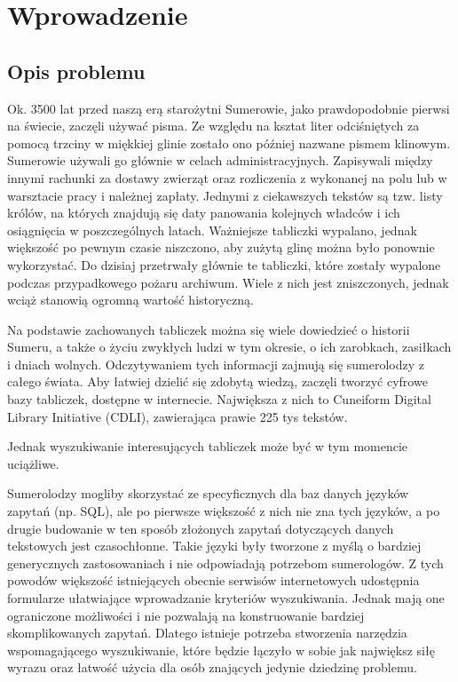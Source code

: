 \chapter*{Wprowadzenie}

 

\section*{Opis problemu}
Ok. 3500 lat przed naszą erą starożytni Sumerowie, jako prawdopodobnie pierwsi na świecie, zaczęli używać pisma. 
Ze względu na ksztat liter odciśniętych za pomocą trzciny w miękkiej glinie zostało ono później nazwane pismem klinowym. 
Sumerowie używali go głównie w celach administracyjnych. Zapisywali między innymi rachunki za dostawy zwierząt oraz rozliczenia z 
wykonanej na polu lub w warsztacie pracy i należnej zapłaty. Jednymi z ciekawszych tekstów są tzw. listy królów, na 
których znajdują się daty panowania kolejnych władców i ich osiągnięcia w poszczególnych latach. 
Ważniejsze tabliczki wypalano, jednak większość po pewnym czasie niszczono, aby zużytą glinę można było ponownie wykorzystać. 
Do dzisiaj przetrwały głównie te tabliczki, które zostały wypalone podczas przypadkowego pożaru archiwum. 
Wiele z nich jest zniszczonych, jednak wciąż stanowią ogromną wartość historyczną. 
 
Na podstawie zachowanych tabliczek można się wiele dowiedzieć o historii Sumeru, a także o życiu zwykłych ludzi w tym okresie, 
o ich zarobkach, zasiłkach i dniach wolnych. Odczytywaniem tych informacji zajmują się sumerolodzy z całego świata. 
Aby łatwiej dzielić się zdobytą wiedzą, zaczęli tworzyć cyfrowe bazy tabliczek, dostępne w internecie. 
Największa z nich to Cuneiform Digital Library Initiative (CDLI), zawierająca prawie 225 tys tekstów.

Jednak wyszukiwanie interesujących tabliczek może być w tym momencie uciążliwe. 

Sumerolodzy mogliby skorzystać ze specyficznych dla baz danych języków zapytań (np. SQL), ale po pierwsze większość z 
nich nie zna tych języków, a po drugie budowanie w ten sposób złożonych zapytań dotyczących danych tekstowych jest czasochłonne. 
Takie języki były tworzone z myślą o bardziej generycznych zastosowaniach i nie odpowiadają potrzebom sumerologów.
Z tych powodów większość istniejących obecnie serwisów internetowych udostępnia formularze ułatwiające wprowadzanie kryteriów
 wyszukiwania. Jednak mają one ograniczone możliwości i nie pozwalają na konstruowanie bardziej skomplikowanych zapytań.
Dlatego istnieje potrzeba stworzenia narzędzia wspomagającego wyszukiwanie, które będzie łączyło w sobie jak największ siłę 
wyrazu oraz łatwość użycia dla osób znających jedynie dziedzinę problemu.

